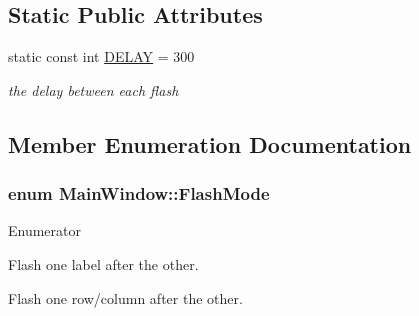 \subsection*{Static Public Attributes}
\begin{DoxyCompactItemize}
\item 
\hypertarget{class_main_window_a19ab095b0f58e8746bfa538ef43b23b4}{static const int \hyperlink{class_main_window_a19ab095b0f58e8746bfa538ef43b23b4}{D\-E\-L\-A\-Y} = 300}\label{class_main_window_a19ab095b0f58e8746bfa538ef43b23b4}

\begin{DoxyCompactList}\small\item\em the delay between each flash \end{DoxyCompactList}\end{DoxyCompactItemize}


\subsection{Member Enumeration Documentation}
\hypertarget{class_main_window_a44abd7eed6ee23341cb378e6dbf60652}{
\subsubsection[{Flash\-Mode}]{\setlength{\rightskip}{0pt plus 5cm}enum {\bf Main\-Window\-::\-Flash\-Mode}}}\label{class_main_window_a44abd7eed6ee23341cb378e6dbf60652}
\begin{Desc}
\item[Enumerator]\par
\begin{description}
\item[{\em 
\hypertarget{class_main_window_a44abd7eed6ee23341cb378e6dbf60652aff8e22f74aaba6a40ec3c140d15b4a56}{One\-By\-One}\label{class_main_window_a44abd7eed6ee23341cb378e6dbf60652aff8e22f74aaba6a40ec3c140d15b4a56}
}]Flash one label after the other. \item[{\em 
\hypertarget{class_main_window_a44abd7eed6ee23341cb378e6dbf60652a445b710505a2c84dff02b98a2f1ba11a}{Binary\-Search}\label{class_main_window_a44abd7eed6ee23341cb378e6dbf60652a445b710505a2c84dff02b98a2f1ba11a}
}]Flash one row/column after the other. \end{description}
\end{Desc}


